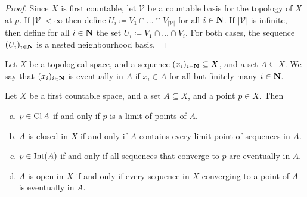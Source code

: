 \begin{proof}
    Since \(X\) is first countable, let \(\mathcal V\) be a countable basis for the
    topology of \(X\) at \(p\). If \(|\mathcal V| < \infty\) then define \(U_i \coloneq
    V_1 \cap \dots \cap V_{|\mathcal V|}\) for all \(i \in \mathbf{N}\). If
    \(|\mathcal V|\) is infinite, then define for all \(i \in \mathbf{N}\) the
    set \(U_i \coloneq V_1 \cap \dots \cap V_i\). For both cases, the sequence
    \((U_i)_{i \in \mathbf{N}}\) is a nested neighbourhood basis.
\end{proof}

\begin{definition}[Eventually in]
    Let \(X\) be a topological space, and a sequence \((x_i)_{i \in \mathbf{N}}
    \subseteq X\), and a set \(A \subseteq X\). We say that \((x_i)_{i \in
            \mathbf{N}}\) is eventually in \(A\) if \(x_i \in A\) for all but finitely
    many \(i \in \mathbf{N}\).
\end{definition}

\begin{lemma}\label{lem: sequence lemma}
    Let \(X\) be a first countable space, and a set \(A \subseteq X\), and a point
    \(p \in X\). Then
    \begin{enumerate}[(a)]
        \item \(p \in \operatorname{Cl} A\) if and only if \(p\) is a limit of points of
              \(A\).
        \item \(A\) is closed in \(X\) if and only if \(A\) contains every limit
              point of sequences in \(A\).
        \item \(p \in \operatorname{Int}(A)\) if and only if all sequences that converge to
              \(p\) are eventually in \(A\).
        \item \(A\) is open in \(X\) if and only if every sequence in \(X\)
              converging to a point of \(A\) is eventually in \(A\).
    \end{enumerate}
\end{lemma}

